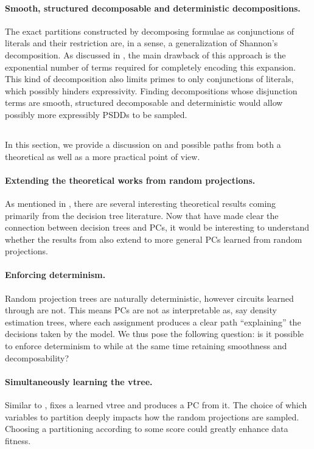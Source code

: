 \paragraph{Smooth, structured decomposable and deterministic decompositions.} The exact partitions
constructed by decomposing formulae as conjunctions of literals and their restriction are, in a
sense, a generalization of Shannon's decomposition. As discussed in , the main
drawback of this approach is the exponential number of terms required for completely encoding this
expansion. This kind of decomposition also limits primes to only conjunctions of literals, which
possibly hinders expressivity. Finding decompositions whose disjunction terms are smooth,
structured decomposable and deterministic would allow possibly more expressibly PSDDs to be
sampled.

\subsection{}

In this section, we provide a discussion on  and possible paths from both a
theoretical as well as a more practical point of view.

\paragraph{Extending the theoretical works from random projections.} As mentioned in ,
there are several interesting theoretical results coming primarily from the decision tree
literature. Now that \citet{correia20} have made clear the connection between decision trees and
PCs, it would be interesting to understand whether the results from \citet{dasgupta08b} also extend
to more general PCs learned from random projections.

\paragraph{Enforcing determinism.} Random projection trees are naturally deterministic, however
circuits learned through  are not. This means  PCs are not as
interpretable as, say density estimation trees, where each assignment produces a clear path
``explaining'' the decisions taken by the model. We thus pose the following question: is it
possible to enforce determinism to  while at the same time retaining smoothness
and decomposability?

\paragraph{Simultaneously learning the vtree.} Similar to , 
fixes a learned vtree and produces a PC from it. The choice of which variables to partition deeply
impacts how the random projections are sampled. Choosing a partitioning according to some score
could greatly enhance data fitness.

